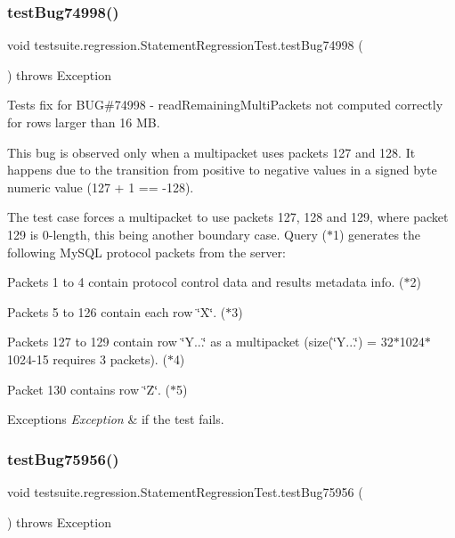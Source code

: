 \subsubsection{\texorpdfstring{test\+Bug74998()}{testBug74998()}}
{\footnotesize\ttfamily void testsuite.\+regression.\+Statement\+Regression\+Test.\+test\+Bug74998 (\begin{DoxyParamCaption}{ }\end{DoxyParamCaption}) throws Exception}

Tests fix for B\+UG\#74998 -\/ read\+Remaining\+Multi\+Packets not computed correctly for rows larger than 16 MB.

This bug is observed only when a multipacket uses packets 127 and 128. It happens due to the transition from positive to negative values in a signed byte numeric value (127 + 1 == -\/128).

The test case forces a multipacket to use packets 127, 128 and 129, where packet 129 is 0-\/length, this being another boundary case. Query ($\ast$1) generates the following My\+S\+QL protocol packets from the server\+:
\begin{DoxyItemize}
\item Packets 1 to 4 contain protocol control data and results metadata info. ($\ast$2)
\item Packets 5 to 126 contain each row \char`\"{}\+X\char`\"{}. ($\ast$3)
\item Packets 127 to 129 contain row \char`\"{}\+Y...\char`\"{} as a multipacket (size(\char`\"{}\+Y...\char`\"{}) = 32$\ast$1024$\ast$1024-\/15 requires 3 packets). ($\ast$4)
\item Packet 130 contains row \char`\"{}\+Z\char`\"{}. ($\ast$5)
\end{DoxyItemize}


\begin{DoxyExceptions}{Exceptions}
{\em Exception} & if the test fails. \\
\hline
\end{DoxyExceptions}
\mbox{\label{classtestsuite_1_1regression_1_1_statement_regression_test_ac552681461db44411308a9164a16e391}} 
\subsubsection{\texorpdfstring{test\+Bug75956()}{testBug75956()}}
{\footnotesize\ttfamily void testsuite.\+regression.\+Statement\+Regression\+Test.\+test\+Bug75956 (\begin{DoxyParamCaption}{ }\end{DoxyParamCaption}) throws Exception}

